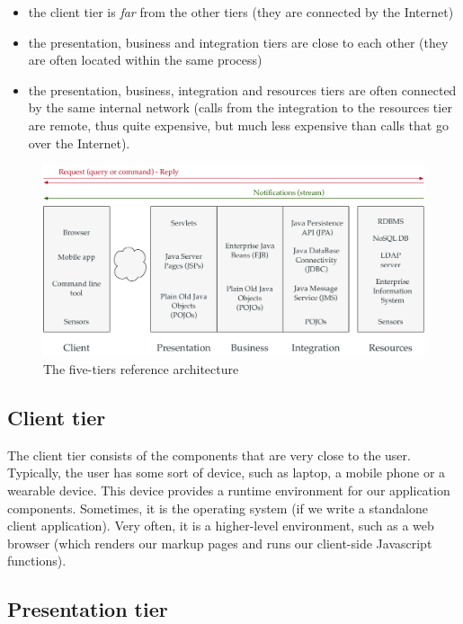 \begin{itemize}
\item the client tier is \emph{far} from the other tiers (they are connected by the Internet)
\item the presentation, business and integration tiers are close to each other (they are often located within the same process)
\item the presentation, business, integration and resources tiers are often connected by the same internal network (calls from the integration to the resources tier are remote, thus quite expensive, but much less expensive than calls that go over the Internet).
\end{itemize}

\begin{figure}[]
	\centering
    \includegraphics[width=1.0\linewidth]{Figures/tiers.pdf}
	\caption{The five-tiers reference architecture}
  \label{fig:five-tiers}
\end{figure}

\subsection{Client tier}


The client tier consists of the components that are very close to the user. Typically, the user has some sort of device, such as laptop, a mobile phone or a wearable device. This device provides a runtime environment for our application components. Sometimes, it is the operating system (if we write a standalone client application). Very often, it is a higher-level environment, such as a web browser (which renders our markup pages and runs our client-side Javascript functions).

\subsection{Presentation tier}

